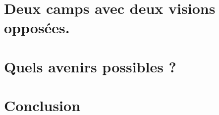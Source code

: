 \documentclass[12pt,a4paper]{article}
\begin{document}
\subsection{}

\subsection{}

\subsection{}

\section{Deux camps avec deux visions opposées.}

\subsection{}

\subsection{}

\section{Quels avenirs possibles ?}

\subsection{}

\subsection{}

\subsection{}

\section{Conclusion}
\end{document}
